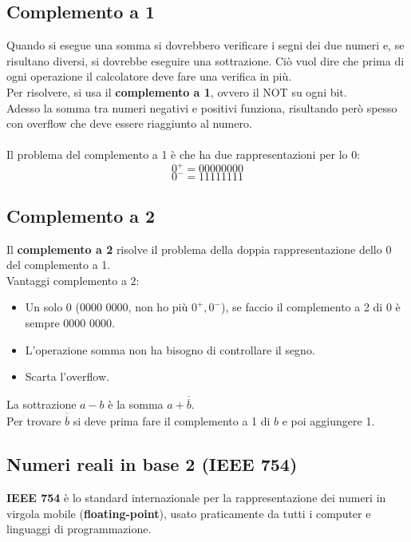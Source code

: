 \documentclass[12pt]{article}
\begin{document}
\subsection{Complemento a 1}
Quando si esegue una somma si dovrebbero verificare i segni dei due numeri e, se risultano diversi, si dovrebbe eseguire una sottrazione. Ciò vuol dire che prima di ogni operazione il calcolatore deve fare una verifica in più.\\
Per risolvere, si usa il \textbf{complemento a 1}, ovvero il NOT su ogni bit.\\
Adesso la somma tra numeri negativi e positivi funziona, risultando però spesso con overflow che deve essere riaggiunto al numero.\\\\
Il problema del complemento a 1 è che ha due rappresentazioni per lo 0:
\[
0^+ = 0000 0000
\]
\[
0^- = 1111 1111
\]

\subsection{Complemento a 2}
Il \textbf{complemento a 2} risolve il problema della doppia rappresentazione dello 0 del complemento a 1.\\
Vantaggi complemento a 2:
\begin{itemize}
  \item Un solo 0 (0000 0000, non ho più $0^+,0^-$), se faccio il complemento a 2 di 0 è sempre 0000 0000.
  \item L'operazione somma non ha bisogno di controllare il segno.
  \item Scarta l'overflow.
\end{itemize}
La sottrazione $a-b$ è la somma $a + \overline{\overline{b}}$.\\
Per trovare $\overline{\overline{b}}$ si deve prima fare il complemento a 1 di $b$ e poi aggiungere 1.\\
  
\subsection{Numeri reali in base 2 (IEEE 754)}
\textbf{IEEE 754} è lo standard internazionale per la rappresentazione dei numeri in virgola mobile (\textbf{floating-point}), usato praticamente da tutti i computer e linguaggi di programmazione.
\end{document}
